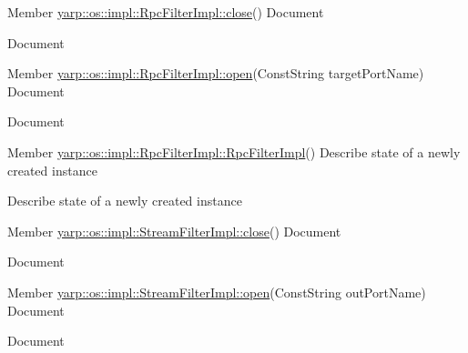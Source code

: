 \label{todo__todo000013}
\hypertarget{todo__todo000013}{}
 
\begin{DoxyDescription}
\item[Member \hyperlink{classyarp_1_1os_1_1impl_1_1_rpc_filter_impl_af8bff36f13d6f2a7460e5e4fd894cd9e}{yarp::os::impl::RpcFilterImpl::close}() ]Document 

Document 
\end{DoxyDescription}

\label{todo__todo000012}
\hypertarget{todo__todo000012}{}
 
\begin{DoxyDescription}
\item[Member \hyperlink{classyarp_1_1os_1_1impl_1_1_rpc_filter_impl_a430fa4ad4d3f633a1e9b91f3ad0a0df4}{yarp::os::impl::RpcFilterImpl::open}(ConstString targetPortName) ]Document 

Document 
\end{DoxyDescription}

\label{todo__todo000001}
\hypertarget{todo__todo000001}{}
 
\begin{DoxyDescription}
\item[Member \hyperlink{classyarp_1_1os_1_1impl_1_1_rpc_filter_impl_a15ed48bd9dfa1d97e242ea54b7d17977}{yarp::os::impl::RpcFilterImpl::RpcFilterImpl}() ]Describe state of a newly created instance 

Describe state of a newly created instance 
\end{DoxyDescription}

\label{todo__todo000016}
\hypertarget{todo__todo000016}{}
 
\begin{DoxyDescription}
\item[Member \hyperlink{classyarp_1_1os_1_1impl_1_1_stream_filter_impl_ad7161adcaae840c0f88c7d24312b774f}{yarp::os::impl::StreamFilterImpl::close}() ]Document 

Document 
\end{DoxyDescription}

\label{todo__todo000015}
\hypertarget{todo__todo000015}{}
 
\begin{DoxyDescription}
\item[Member \hyperlink{classyarp_1_1os_1_1impl_1_1_stream_filter_impl_addabbbd78373c7aa7e4712776064891e}{yarp::os::impl::StreamFilterImpl::open}(ConstString outPortName) ]Document 

Document 
\end{DoxyDescription}

